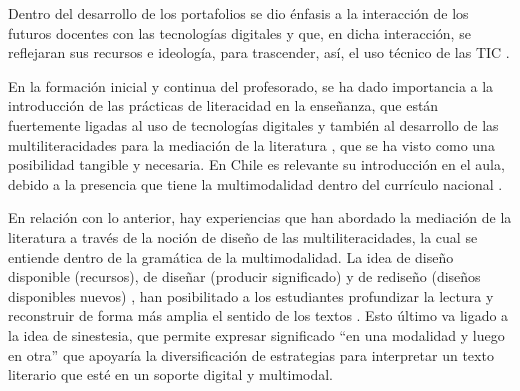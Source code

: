 	Dentro del desarrollo de los portafolios se dio énfasis a la interacción
	de los futuros docentes con las tecnologías digitales y que, en dicha
	interacción, se reflejaran sus recursos e ideología, para trascender,
	así, el uso técnico de las TIC \cite{dowdall2021digital}.
	
	En la formación inicial y continua del profesorado, se ha dado
	importancia a la introducción de las prácticas de literacidad en la
	enseñanza, que están fuertemente ligadas al uso de tecnologías digitales
	\cite{thibaut_2020} y también al desarrollo de las multiliteracidades para
	la mediación de la literatura \cite{godoy2023,cabrerocafort2021}, que
	se ha visto como una posibilidad tangible y necesaria. En Chile es
	relevante su introducción en el aula, debido a la presencia que tiene la
	multimodalidad dentro del currículo nacional \cite{meneses_literacidad_2023}.
	
	En relación con lo anterior, hay experiencias que han abordado la
	mediación de la literatura a través de la noción de diseño de las
	multiliteracidades, la cual se entiende dentro de la gramática de la
	multimodalidad. La idea de diseño disponible (recursos), de diseñar
	(producir significado) y de rediseño (diseños disponibles nuevos)
	\cite{kalantzis_cope_new_learning}, han posibilitado a los estudiantes profundizar
	la lectura y reconstruir de forma más amplia el sentido de los textos
	\cite{Fernandes_2018}. Esto último va ligado a la idea de sinestesia, que
	permite expresar significado ``en una modalidad y luego en otra''
	\cite[p. 244]{kalantzis2019} que apoyaría la diversificación
	de estrategias para interpretar un texto literario que esté en un
	soporte digital y multimodal.
	
	


		
